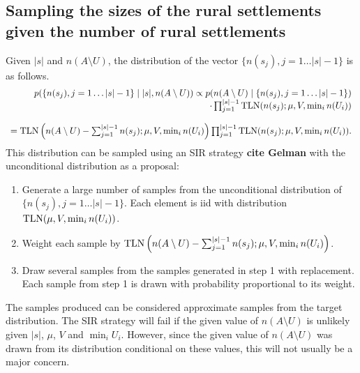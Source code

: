 \documentclass[a4paper]{article}
\begin{document}
\subsection{Sampling the sizes of the rural settlements given the number of rural settlements}
Given $|s|$ and $n(A\setminus U)$, the distribution of the vector $\{n(s_j),j=1\ldots |s|-1\}$ is as follows.
\begin{equation}
	\begin{array}{r}
		p(\{n(s_j),j=1\ldots |s|-1\}\mid|s|,n(A\setminus U))\propto p(n(A\setminus U)\mid\{n(s_j),j=1\ldots |s|-1\})\\\cdot\prod_{j=1}^{|s|-1}\textup{TLN}(n(s_j);\mu, V, \min_i n(U_i))\\\\
		= \textup{TLN}\left(n(A\setminus U)-\sum_{j=1}^{|s|-1}n(s_j);\mu,V,\min_i n(U_i)\right)\prod_{j=1}^{|s|-1}\textup{TLN}(n(s_j);\mu, V, \min_i n(U_i)).
	\end{array}
\end{equation}
This distribution can be sampled using an SIR strategy \textbf{cite Gelman} with the unconditional distribution as a proposal:
\begin{enumerate}
	\item Generate a large number of samples from the unconditional distribution of $\{n(s_j),j=1\ldots |s|-1\}$. Each element is iid with distribution $\textup{TLN}(\mu, V, \min_i n(U_i))$.
	\item Weight each sample by $\textup{TLN}\left(n(A\setminus U)-\sum_{j=1}^{|s|-1}n(s_j);\mu,V,\min_i n(U_i)\right)$.
	\item Draw several samples from the samples generated in step 1 with replacement. Each sample from step 1 is drawn with probability proportional to its weight.
\end{enumerate}
The samples produced can be considered approximate samples from the target distribution. The SIR strategy will fail if the given value of $n(A\setminus U)$ is unlikely given $|s|$, $\mu$, $V$ and $\min_i U_i$. However, since the given value of $n(A\setminus U)$ was drawn from its distribution conditional on these values, this will not usually be a major concern.

\end{document}
